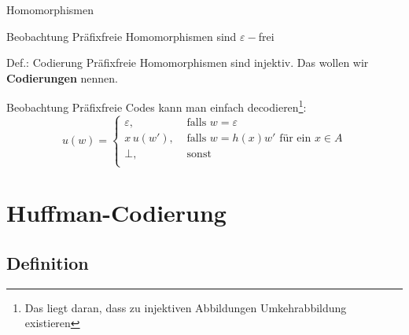 \begin{frame}{Homomorphismen}
	\begin{exampleblock}{Beobachtung}
		Präfixfreie Homomorphismen sind $\varepsilon-$frei
	\end{exampleblock}

	\begin{block}{Def.: Codierung}
		Präfixfreie Homomorphismen sind injektiv. Das wollen wir \textbf{Codierungen} nennen.
	\end{block}

	\begin{exampleblock}{Beobachtung}
		Präfixfreie Codes kann man einfach decodieren\footnote{Das liegt daran, dass zu injektiven Abbildungen  Umkehrabbildung existieren}:
		\[
		u(w) = 
		\begin{cases}
		\varepsilon, & \text{ falls } w=\varepsilon\\
		x\,u(w'), & \text{ falls } w=h(x)w' \text{ für ein } x\in A \\
		\bot,  & \text{ sonst }\\
		\end{cases}
		\]
	\end{exampleblock}
\end{frame}

\section{Huffman-Codierung}
\subsection{Definition}

